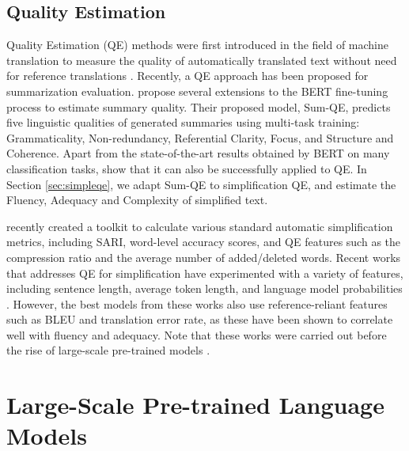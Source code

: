 \documentclass[thesis.tex]{subfiles}
\begin{document}
\subsection{Quality Estimation}

Quality Estimation (QE) methods were first introduced in the field of machine translation to measure the quality of automatically translated text without need for reference translations  \citep{bojar2017findings,martins2017pushing,specia2018findings}. Recently, a QE approach has been proposed for summarization evaluation. \cite{xenouleas2019sumqe} propose several extensions to the BERT fine-tuning process \citep{devlin2019bert} to estimate summary quality. Their proposed model, Sum-QE, predicts five linguistic qualities of generated summaries using multi-task training: Grammaticality, Non-redundancy, Referential Clarity, Focus, and Structure and Coherence. Apart from the state-of-the-art results obtained by BERT on many classification tasks, \cite{xenouleas2019sumqe} show that it can also be successfully applied to QE. In Section \ref{sec:simpleqe}, we adapt Sum-QE to simplification QE, and estimate the Fluency, Adequacy and Complexity of simplified text.

\cite{manchego2019easse} recently created a toolkit to calculate various standard automatic simplification metrics, including SARI, word-level accuracy scores, and QE features such as the compression ratio and the average number of added/deleted words. Recent works that addresses QE for simplification have experimented with a variety of features, including sentence length, average token length, and language model probabilities \citep{stajner2016quality,martin2018reference}. However, the best models from these works also use reference-reliant features such as BLEU and translation error rate, as these have been shown to correlate well with fluency and adequacy. Note that these works were carried out before the rise of large-scale pre-trained models \citep{peters2018deep,devlin2019bert}.

\section{Large-Scale Pre-trained Language Models} \label{sec:lm_review}
\end{document}
